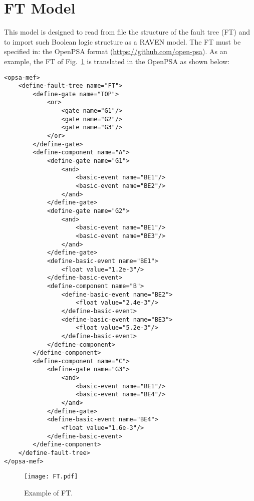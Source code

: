 \section{FT Model}
\label{sec:FTModel}

This model is designed to read from file the structure of the fault tree (FT) and to import such Boolean logic structure as a RAVEN model.
The FT must be specified in: the OpenPSA format (\href{<url>}{https://github.com/open-psa}).
As an example, the FT of Fig.~\ref{fig:FT} is translated in the OpenPSA as shown below:

\begin{lstlisting}[style=XML,morekeywords={anAttribute},caption=FT in OpenPSA format., label=lst:FTModel]
<opsa-mef>
    <define-fault-tree name="FT">
        <define-gate name="TOP">
            <or>
                <gate name="G1"/>
                <gate name="G2"/>
                <gate name="G3"/>
            </or>
        </define-gate>
        <define-component name="A">
            <define-gate name="G1">
                <and>
                    <basic-event name="BE1"/>
                    <basic-event name="BE2"/>
                </and>
            </define-gate>
            <define-gate name="G2">
                <and>
                    <basic-event name="BE1"/>
                    <basic-event name="BE3"/>
                </and>
            </define-gate>
            <define-basic-event name="BE1">
                <float value="1.2e-3"/>
            </define-basic-event>
            <define-component name="B">
                <define-basic-event name="BE2">
                    <float value="2.4e-3"/>
                </define-basic-event>
                <define-basic-event name="BE3">
                    <float value="5.2e-3"/>
                </define-basic-event>
            </define-component>
        </define-component>
        <define-component name="C">
            <define-gate name="G3">
                <and>
                    <basic-event name="BE1"/>
                    <basic-event name="BE4"/>
                </and>
            </define-gate>
            <define-basic-event name="BE4">
                <float value="1.6e-3"/>
            </define-basic-event>
        </define-component>
    </define-fault-tree>
</opsa-mef>
\end{lstlisting}

\begin{figure}
    \centering
    \centerline{\texttt{[image: FT.pdf]}}
    \caption{Example of FT.}
    \label{fig:FT}
\end{figure}

